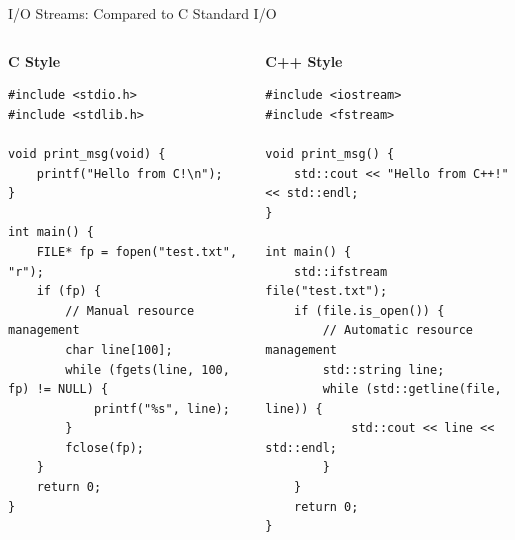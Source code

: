 \begin{frame}[fragile]{I/O Streams: Compared to C Standard I/O}
	\begin{columns}
		\begin{column}{0.5\textwidth}
			\textbf{C Style}
			\begin{verbatim}
#include <stdio.h>
#include <stdlib.h>

void print_msg(void) {
    printf("Hello from C!\n");
}

int main() {
    FILE* fp = fopen("test.txt", "r");
    if (fp) {
        // Manual resource management
        char line[100];
        while (fgets(line, 100, fp) != NULL) {
            printf("%s", line);
        }
        fclose(fp);
    }
    return 0;
}
			\end{verbatim}
		\end{column}
		\begin{column}{0.5\textwidth}
			\textbf{C++ Style}
			\begin{verbatim}
#include <iostream>
#include <fstream>

void print_msg() {
    std::cout << "Hello from C++!" << std::endl;
}

int main() {
    std::ifstream file("test.txt");
    if (file.is_open()) {
        // Automatic resource management
        std::string line;
        while (std::getline(file, line)) {
            std::cout << line << std::endl;
        }
    }
    return 0;
}
			\end{verbatim}
		\end{column}
	\end{columns}
\end{frame}

